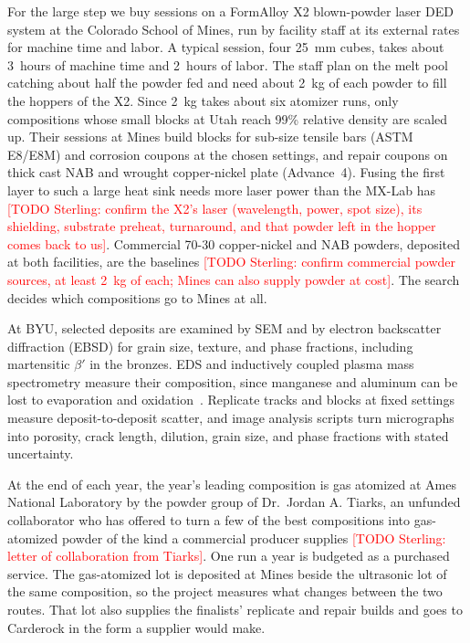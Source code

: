 \documentclass[12pt,letterpaper]{article}
\newcommand{\todo}[1]{\textcolor{red}{[TODO Sterling: #1]}}
\begin{document}
For the large step we buy sessions on a FormAlloy X2 blown-powder laser DED
system at the Colorado School of Mines, run by facility staff at its external rates for
machine time and labor.
A typical session, four 25~mm cubes, takes about 3~hours of machine time and 2~hours of labor.
The staff plan on the melt pool catching about half the powder fed and need about 2~kg of each powder to fill the hoppers of the X2.
Since 2~kg takes about six atomizer runs, only compositions whose small blocks at Utah reach 99\% relative density are scaled up.
Their sessions at Mines build blocks for sub-size tensile bars (ASTM E8/E8M) and corrosion coupons at the chosen settings, and repair coupons on thick cast NAB and wrought copper-nickel plate (Advance~4).
Fusing the first layer to such a large heat sink needs more laser power than the MX-Lab has \todo{confirm the X2's laser (wavelength, power, spot size), its
shielding, substrate preheat, turnaround, and that powder left in the hopper
comes back to us}. Commercial 70-30 copper-nickel and NAB powders, deposited
at both facilities, are the baselines \todo{confirm commercial powder
sources, at least 2~kg of each; Mines can also supply powder at cost}. The
search decides which compositions go to Mines at all.

At BYU, selected deposits are examined by SEM and by electron backscatter diffraction (EBSD) for grain size, texture, and phase fractions, including martensitic $\beta'$ in the bronzes.
EDS and inductively coupled plasma mass spectrometry measure their composition, since manganese and aluminum can be lost to evaporation and oxidation~\cite{debroy2018}.
Replicate tracks and blocks at fixed settings measure deposit-to-deposit
scatter, and image analysis scripts turn micrographs into porosity, crack
length, dilution, grain size, and phase fractions with stated uncertainty.

At the end of each year, the year's leading composition is gas atomized at
Ames National Laboratory by the powder group of Dr.~Jordan A. Tiarks, an
unfunded collaborator who has offered to turn a few of the best compositions
into gas-atomized powder of the kind a commercial producer supplies
\todo{letter of collaboration from Tiarks}. One run a year is budgeted as a purchased service. The
gas-atomized lot is deposited at Mines beside the ultrasonic lot of the same
composition, so the project measures what changes between the two routes.
That lot also supplies the finalists' replicate and repair builds and goes to
Carderock in the form a supplier would make.
\end{document}
